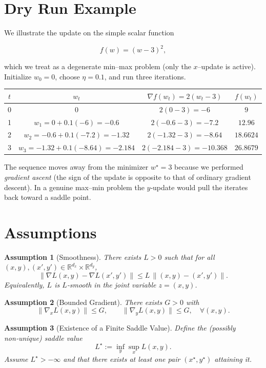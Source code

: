 \documentclass{article}
\newtheorem{assumption}{Assumption}
\newcommand{\grad}{\nabla}
\newcommand{\R}{\mathbb{R}}
\begin{document}
\section*{Dry Run Example}
We illustrate the update on the simple scalar function  

\[
f(w)=(w-3)^2,
\]

which we treat as a degenerate min–max problem (only the $x$–update is active).  
Initialize $w_0=0$, choose $\eta=0.1$, and run three iterations.

\begin{center}
\begin{tabular}{c|c|c|c}
$t$ & $w_t$ & $\grad f(w_t)=2(w_t-3)$ & $f(w_t)$ \\ \hline
0 & $0$ & $2(0-3)=-6$ & $9$ \\
1 & $w_1=0+0.1(-6)= -0.6$ & $2(-0.6-3)=-7.2$ & $12.96$ \\
2 & $w_2=-0.6+0.1(-7.2)= -1.32$ & $2(-1.32-3)=-8.64$ & $18.6624$ \\
3 & $w_3=-1.32+0.1(-8.64)= -2.184$ & $2(-2.184-3)=-10.368$ & $26.8679$
\end{tabular}
\end{center}

The sequence moves away from the minimizer $w^\star=3$ because we performed \emph{gradient ascent} (the sign of the update is opposite to that of ordinary gradient descent).  In a genuine max–min problem the $y$‑update would pull the iterates back toward a saddle point.

\newpage

\section*{Assumptions}
\begin{assumption}[Smoothness]\label{as:smooth}
There exists $L>0$ such that for all $(x,y),(x',y')\in\R^{d_x}\times\R^{d_y}$,
\[
\big\|\grad L(x,y)-\grad L(x',y')\big\| \le L\,
\big\|(x,y)-(x',y')\big\|.
\]
Equivalently, $L$ is $L$‑smooth in the joint variable $z=(x,y)$.
\end{assumption}

\begin{assumption}[Bounded Gradient]\label{as:bound}
There exists $G>0$ with 
\[
\big\|\grad_{x}L(x,y)\big\|\le G,\qquad 
\big\|\grad_{y}L(x,y)\big\|\le G,\quad\forall (x,y).
\]
\end{assumption}

\begin{assumption}[Existence of a Finite Saddle Value]\label{as:saddle}
Define the (possibly non‑unique) saddle value 
\[
L^\star:=\inf_{y}\sup_{x}L(x,y).
\]
Assume $L^\star>-\infty$ and that there exists at least one pair $(x^\star,y^\star)$ attaining it.
\end{assumption}
\end{document}
